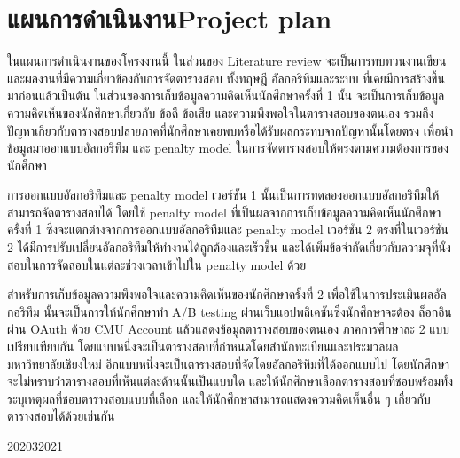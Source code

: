 \section{\ifcpe แผนการดำเนินงาน\else Project plan\fi}
ในแผนการดำเนินงานของโครงงานนี้ ในส่วนของ Literature review จะเป็นการทบทวนงานเขียนและผลงานที่มีความเกี่ยวข้องกับการจัดตารางสอบ
ทั้งทฤษฎี อัลกอริทึมและระบบ ที่เคยมีการสร้างขึ้นมาก่อนแล้วเป็นต้น ในส่วนของการเก็บข้อมูลความคิดเห็นนักศึกษาครั้งที่ 1 นั้น
จะเป็นการเก็บข้อมูลความคิดเห็นของนักศึกษาเกี่ยวกับ ข้อดี ข้อเสีย และความพึงพอใจในตารางสอบของตนเอง รวมถึงปัญหาเกี่ยวกับตารางสอบปลายภาคที่นักศึกษาเคยพบหรือได้รับผลกระทบจากปัญหานั้นโดยตรง
เพื่อนำข้อมูลมาออกแบบอัลกอริทึม และ penalty model ในการจัดตารางสอบให้ตรงตามความต้องการของนักศึกษา


การออกแบบอัลกอริทึมและ penalty model เวอร์ชัน 1 นั้นเป็นการทดลองออกแบบอัลกอริทึมให้สามารถจัดตารางสอบได้
โดยใช้ penalty model ที่เป็นผลจากการเก็บข้อมูลความคิดเห็นนักศึกษาครั้งที่ 1 
ซึ่งจะแตกต่างจากการออกแบบอัลกอริทึมและ penalty model เวอร์ชัน 2
ตรงที่ในเวอร์ชัน 2 ได้มีการปรับเปลี่ยนอัลกอริทึมให้ทำงานได้ถูกต้องและเร็วขึ้น และได้เพิ่มข้อจำกัดเกี่ยวกับความจุที่นั่งสอบในการจัดสอบในแต่ละช่วงเวลาเข้าไปใน penalty model ด้วย


สำหรับการเก็บข้อมูลความพึงพอใจและความคิดเห็นของนักศึกษาครั้งที่ 2 เพื่อใช้ในการประเมินผลอัลกอริทึม นั้นจะเป็นการให้นักศึกษาทำ A/B testing 
ผ่านเว็บแอปพลิเคชันซึ่งนักศึกษาจะต้อง
ล็อกอินผ่าน OAuth ด้วย CMU Account แล้วแสดงข้อมูลตารางสอบของตนเอง ภาคการศึกษาละ 2 แบบ เปรียบเทียบกัน
โดยแบบหนึ่งจะเป็นตารางสอบที่กำหนดโดยสำนักทะเบียนและประมวลผล มหาวิทยาลัยเชียงใหม่ 
อีกแบบหนึ่งจะเป็นตารางสอบที่จัดโดยอัลกอริทึมที่ได้ออกแบบไป โดยนักศึกษาจะไม่ทราบว่าตารางสอบที่เห็นแต่ละด้านนั้นเป็นแบบใด และให้นักศึกษาเลือกตารางสอบที่ชอบพร้อมทั้งระบุเหตุผลที่ชอบตารางสอบแบบที่เลือก
และให้นักศึกษาสามารถแสดงความคิดเห็นอื่น ๆ เกี่ยวกับตารางสอบได้ด้วยเช่นกัน

\begin{plan}{7}{2020}{3}{2021}
\end{plan}

